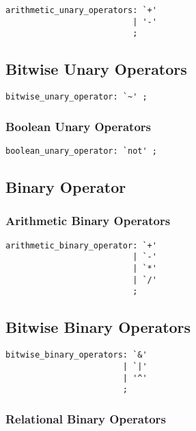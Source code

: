 \documentclass{article}
\begin{document}
\begin{lstlisting}
arithmetic_unary_operators: `+'
                          | '-'
                          ;
\end{lstlisting}

\subsection{Bitwise Unary Operators}

\begin{lstlisting}
bitwise_unary_operator: `~' ;
\end{lstlisting}

\subsubsection{Boolean Unary Operators}

\begin{lstlisting}
boolean_unary_operator: `not' ;
\end{lstlisting}

\subsection{Binary Operator}

\subsubsection{Arithmetic Binary Operators}

\begin{lstlisting}
arithmetic_binary_operator: `+'
                          | `-'
                          | `*'
                          | `/'
                          ;
\end{lstlisting}

\subsection{Bitwise Binary Operators}

\begin{lstlisting}
bitwise_binary_operators: `&'
                        | `|'
                        | '^'
                        ;
\end{lstlisting}

\subsubsection{Relational Binary Operators}
\end{document}

